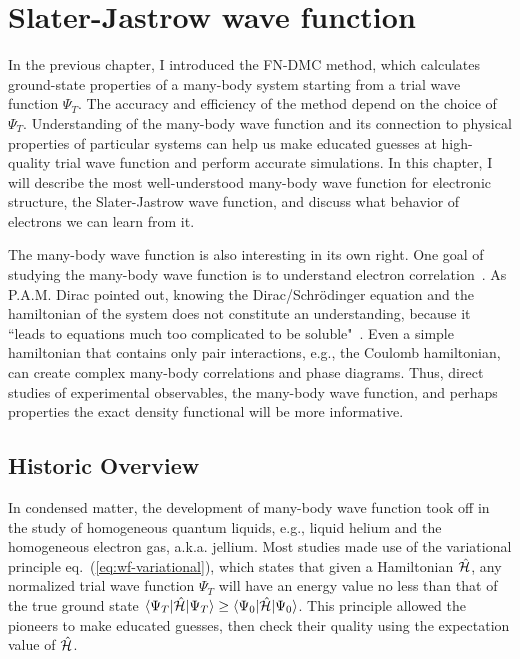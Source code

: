 \chapter{Slater-Jastrow wave function} \label{chap:sj-wf}

In the previous chapter, I introduced the FN-DMC method, which calculates ground-state properties of a many-body system starting from a trial wave function $\Psi_T$. The accuracy and efficiency of the method depend on the choice of $\Psi_T$.
Understanding of the many-body wave function and its connection to physical properties of particular systems can help us make educated guesses at high-quality trial wave function and perform accurate simulations.
In this chapter, I will describe the most well-understood many-body wave function for electronic structure, the Slater-Jastrow wave function, and discuss what behavior of electrons we can learn from it.

The many-body wave function is also interesting in its own right. One goal of studying the many-body wave function is to understand electron correlation~\cite{Ceperley1999-wf}.
As P.A.M. Dirac pointed out, knowing the Dirac/Schr\"odinger equation and the hamiltonian of the system does not constitute an understanding, because it ``leads to equations much too complicated to be soluble"~\cite{Dirac1929}.
Even a simple hamiltonian that contains only pair interactions, e.g., the Coulomb hamiltonian, can create complex many-body correlations and phase diagrams.
Thus, direct studies of experimental observables, the many-body wave function, and perhaps properties the exact density functional will be more informative.


\section{Historic Overview}

In condensed matter, the development of many-body wave function took off in the study of homogeneous quantum liquids, e.g., liquid helium and the homogeneous electron gas, a.k.a. jellium. Most studies made use of the variational principle eq.~(\ref{eq:wf-variational}), which states that given a Hamiltonian $\hat{\mathcal{H}}$, any normalized trial wave function $\Psi_T$ will have an energy value no less than that of the true ground state $\braket{\Psi_T|\hat{\mathcal{H}}|\Psi_T}\ge\braket{\Psi_0|\hat{\mathcal{H}}|\Psi_0}$. This principle allowed the pioneers to make educated guesses, then check their quality using the expectation value of $\hat{\mathcal{H}}$.


